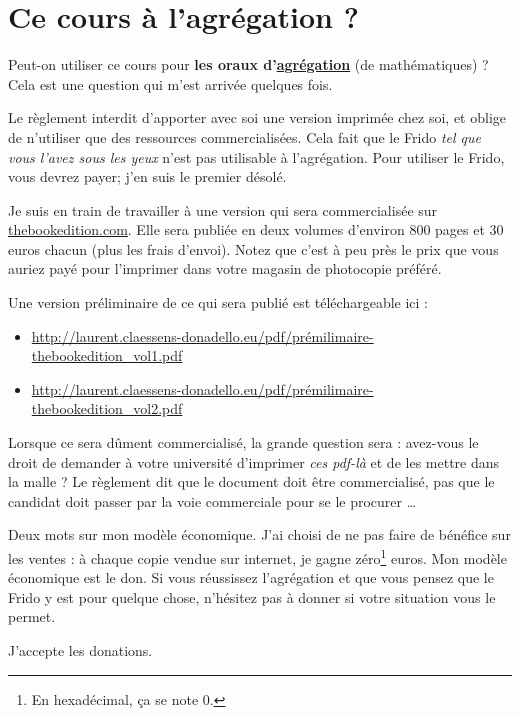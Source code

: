 
\section*{Ce cours à l'agrégation ?}

Peut-on utiliser ce cours pour \textbf{les oraux d'\href{http://agreg.org/}{agrégation}} (de mathématiques) ?  Cela est une question qui m'est arrivée quelques fois.  

Le règlement interdit d'apporter avec soi une version imprimée chez soi, et oblige de n'utiliser que des ressources commercialisées. Cela fait que le Frido \emph{tel que vous l'avez sous les yeux} n'est pas utilisable à l'agrégation. Pour utiliser le Frido, vous devrez payer; j'en suis le premier désolé.

Je suis en train de travailler à une version qui sera commercialisée sur \href{http://www.thebookedition.com/fr/}{thebookedition.com}. Elle sera publiée en deux volumes d'environ \( 800\) pages et \( 30\) euros chacun (plus les frais d'envoi). Notez que c'est à peu près le prix que vous auriez payé pour l'imprimer dans votre magasin de photocopie préféré.

Une version préliminaire de ce qui sera publié est téléchargeable ici :
\begin{itemize}
    \item \url{http://laurent.claessens-donadello.eu/pdf/prémilimaire-thebookedition_vol1.pdf}
    \item \url{http://laurent.claessens-donadello.eu/pdf/prémilimaire-thebookedition_vol2.pdf}
\end{itemize}
Lorsque ce sera dûment commercialisé, la grande question sera : avez-vous le droit de demander à votre université d'imprimer \emph{ces pdf-là} et de les mettre dans la malle ? Le règlement dit que le document doit être commercialisé, pas que le candidat doit passer par la voie commerciale pour se le procurer \ldots

Deux mots sur mon modèle économique. J'ai choisi de ne pas faire de bénéfice sur les ventes : à chaque copie vendue sur internet, je gagne zéro\footnote{En hexadécimal, ça se note \( 0\).} euros. Mon modèle économique est le don. Si vous réussissez l'agrégation et que vous pensez que le Frido y est pour quelque chose, n'hésitez pas à donner si votre situation vous le permet.

\vfill

J'accepte les donations.

